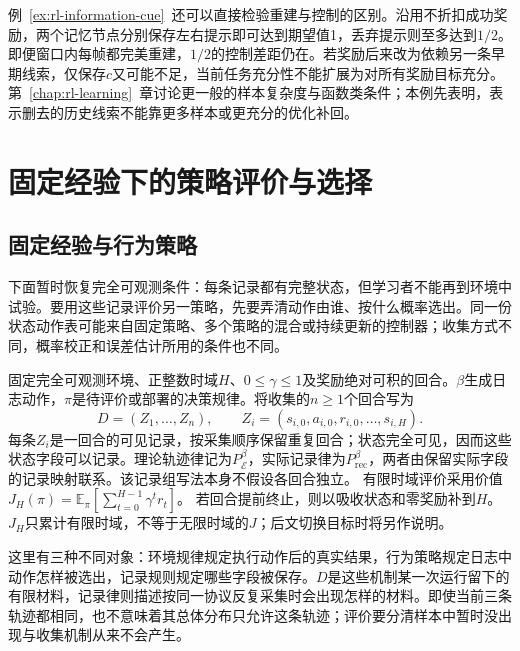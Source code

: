 例~\ref{ex:rl-information-cue}~还可以直接检验重建与控制的区别。沿用不折扣成功奖励，两个记忆节点分别保存左右提示即可达到期望值1，丢弃提示则至多达到$1/2$。即便窗口内每帧都完美重建，$1/2$的控制差距仍在。若奖励后来改为依赖另一条早期线索，仅保存$c$又可能不足，当前任务充分性不能扩展为对所有奖励目标充分。第~\ref{chap:rl-learning}~章讨论更一般的样本复杂度与函数类条件；本例先表明，表示删去的历史线索不能靠更多样本或更充分的优化补回。

\section{固定经验下的策略评价与选择}
\label{sec:rl-information-evaluation}

\subsection{固定经验与行为策略}
\label{sec:rl-information-logging}

下面暂时恢复完全可观测条件：每条记录都有完整状态，但学习者不能再到环境中试验。要用这些记录评价另一策略，先要弄清动作由谁、按什么概率选出。同一份状态动作表可能来自固定策略、多个策略的混合或持续更新的控制器；收集方式不同，概率校正和误差估计所用的条件也不同。

\begin{definition}[行为策略与目标策略]
  \label{def:rl-information-behavior}
  固定完全可观测环境、正整数时域$H$、$0\leq\gamma\leq1$及奖励绝对可积的回合。$\beta$生成日志动作，$\pi$是待评价或部署的决策规律。将收集的$n\geq1$个回合写为
  \[
    D=(Z_1,\ldots,Z_n),\qquad
    Z_i=(s_{i,0},a_{i,0},r_{i,0},\ldots,s_{i,H}).
  \]
  每条$Z_i$是一回合的可见记录，按采集顺序保留重复回合；状态完全可见，因而这些状态字段可以记录。理论轨迹律记为$P_{\mathcal E}^\beta$，实际记录律为$P_{\mathrm{rec}}^\beta$，两者由保留实际字段的记录映射联系。该记录组写法本身不假设各回合独立。
  有限时域评价采用价值
  $J_H(\pi)=\mathbb E_\pi[\sum_{t=0}^{H-1}\gamma^t r_t]$。
  若回合提前终止，则以吸收状态和零奖励补到$H$。$J_H$只累计有限时域，不等于无限时域的$J$；后文切换目标时将另作说明。
\end{definition}

这里有三种不同对象：环境规律规定执行动作后的真实结果，行为策略规定日志中动作怎样被选出，记录规则规定哪些字段被保存。$D$是这些机制某一次运行留下的有限材料，记录律则描述按同一协议反复采集时会出现怎样的材料。即使当前三条轨迹都相同，也不意味着其总体分布只允许这条轨迹；评价要分清样本中暂时没出现与收集机制从来不会产生。


